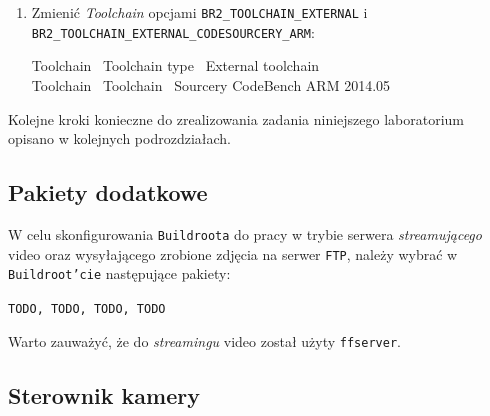 \documentclass{article}
\newenvironment{ttblock}{\ttfamily}{\par}
\begin{document}
\begin{enumerate}
\item Zmienić \emph{Toolchain} opcjami \texttt{BR2\_TOOLCHAIN\_EXTERNAL} i\\ \texttt{BR2\_TOOLCHAIN\_EXTERNAL\_CODESOURCERY\_ARM}:

\begin{ttblock}
Toolchain \textrightarrow\ Toolchain type \textrightarrow\ External toolchain\\
Toolchain \textrightarrow\ Toolchain \textrightarrow\ Sourcery CodeBench ARM 2014.05
\end{ttblock}

%
\end{enumerate}

Kolejne kroki konieczne do zrealizowania zadania niniejszego laboratorium opisano w kolejnych podrozdziałach.


\subsection{Pakiety dodatkowe}

W celu skonfigurowania \texttt{Buildroota} do pracy w trybie serwera \emph{streamującego} video oraz wysyłającego zrobione zdjęcia na serwer \texttt{FTP}, należy wybrać w \texttt{Buildroot'cie} następujące pakiety:
\begin{center}
\texttt{TODO, TODO, TODO, TODO}
\end{center}
Warto zauważyć, że do \emph{streamingu} video został użyty \texttt{ffserver}.


\subsection{Sterownik kamery}
\end{document}
